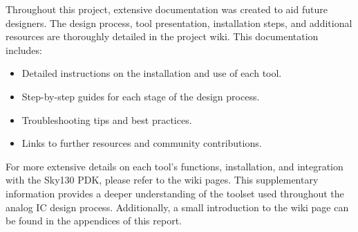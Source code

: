 Throughout this project, extensive documentation was created to aid future designers. The design process, tool presentation, installation steps, and additional resources are thoroughly detailed in the project wiki. This documentation includes:
\begin{itemize}
\item Detailed instructions on the installation and use of each tool.
\item Step-by-step guides for each stage of the design process.
\item Troubleshooting tips and best practices.
\item Links to further resources and community contributions.
\end{itemize}

For more extensive details on each tool's functions, installation, and integration with the Sky130 PDK, please refer to the wiki pages. This supplementary information provides a deeper understanding of the toolset used throughout the analog IC design process. Additionally, a small introduction to the wiki page can be found in the appendices of this report.